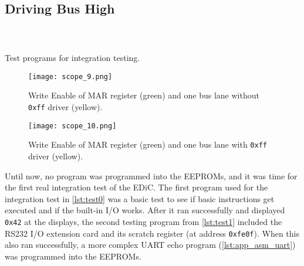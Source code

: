 \subsection{Driving Bus High}\label{sec:eval_bus}
\begin{listing}[t]
  \centering
  \begin{sublisting}[b]{.45\textwidth}
    \inputminted[linenos,
      breaklines,
      frame=leftline,
      xleftmargin=20pt,
    ]{ARM}{src/test0.s}
    \label{lst:test0}
  \end{sublisting}

  \begin{sublisting}[b]{.45\textwidth}
    \inputminted[linenos,
      breaklines,
      frame=leftline,
      xleftmargin=20pt,
    ]{ARM}{src/test1.s}
    \label{lst:test1}
  \end{sublisting}%
  \hspace{.05\textwidth}
  \begin{sublisting}[b]{.45\textwidth}
    \inputminted[linenos,
      breaklines,
      frame=leftline,
      xleftmargin=20pt,
    ]{ARM}{src/test2.s}
    \label{lst:test2}
  \end{sublisting}
  \caption{Test programs for integration testing.}
\end{listing}
\begin{figure}[t]
  \texttt{[image: scope\_9.png]}
  \caption{Write Enable of \gls{MAR} register (green) and one bus lane without \texttt{0xff} driver (yellow).}
  \label{fig:busPullup}
\end{figure}
\begin{figure}[t]
  \texttt{[image: scope\_10.png]}
  \caption{Write Enable of \gls{MAR} register (green) and one bus lane with \texttt{0xff} driver (yellow).}
  \label{fig:busPullupFix}
\end{figure}
Until now, no program was programmed into the \glspl{EEPROM}, and it was time for the first real integration test of the \gls{EDiC}.
The first program used for the integration test in \cref{lst:test0} was a basic test to see if basic instructions get executed and if the built-in I/O works.
After it ran successfully and displayed \texttt{0x42} at the displays, the second testing program from \cref{lst:test1} included the RS232 I/O extension card and its scratch register (at address \texttt{0xfe0f}).
When this also ran successfully, a more complex \gls{UART} echo program (\cref{lst:app_asm_uart}) was programmed into the \glspl{EEPROM}.
